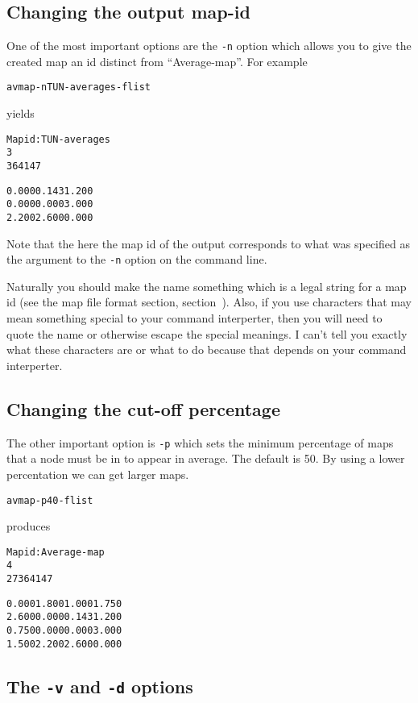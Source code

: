\documentclass[%
	11pt,
        a4paper,
        twoside]{workrep}
\newcommand*{\opt}[1]{\texttt{#1}}		%
\begin{document}
\subsection{Changing the output map-id}

One of the most important options are the \opt{-n} option which
allows you to give the created map an id distinct
from ``Average-map''.  For example
\begin{alltt}
 avmap -n TUN-averages -f list
\end{alltt}
yields
\begin{alltt}
Map id: TUN-averages
3
    36     41     47

 0.000  0.143  1.200
 0.000  0.000  3.000
 2.200  2.600  0.000
\end{alltt}
Note that the here the map id of the output corresponds to what
was specified as the argument to the \opt{-n} option on the
command line.

Naturally you should make the name something which is a legal
string for a map id (see the map file format section,
section~).
Also, if you use characters that may mean something
special to your command interperter, then you will need to quote
the name or otherwise escape the special meanings.  I can't tell
you exactly what these characters are or what to do because
that depends on your command interperter.

\subsection{Changing the cut-off percentage}

The other important option is \opt{-p} which sets the minimum percentage of
maps that a node must be in to appear in average.  The default
is 50.  By using a lower percentation we can get larger maps.
\begin{alltt}
 avmap -p40 -flist
\end{alltt}
produces
\begin{alltt}
Map id: Average-map
4
    27     36     41     47

 0.000  1.800  1.000  1.750
 2.600  0.000  0.143  1.200
 0.750  0.000  0.000  3.000
 1.500  2.200  2.600  0.000
\end{alltt}

\subsection{The \opt{-v} and \opt{-d} options}
\end{document}
